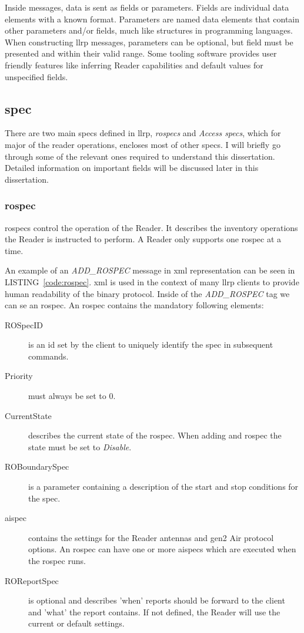 Inside messages, data is sent as fields or parameters.
Fields are individual data elements with a known format.
Parameters are named data elements that contain other parameters and/or fields, much like structures in programming languages.
When constructing \ac{llrp} messages, parameters can be optional, but field must be presented and within their valid range. Some tooling software provides user friendly features like inferring Reader capabilities and default values for unspecified fields.

\subsection{\acf{spec}}

There are two main \acp{spec} defined in \ac{llrp}, \textit{\acp{rospec}} and \textit{Access \acp{spec}}, which for major of the reader operations, encloses most of other \acp{spec}.
I will briefly go through some of the relevant ones required to understand this dissertation. Detailed information on important fields will be discussed later in this dissertation.

\subsubsection{\acf{rospec}}

\acp{rospec} control the operation of the Reader. It describes the inventory operations the Reader is instructed to perform.
A Reader only supports one \ac{rospec} at a time.

An example of an \textit{ADD\_ROSPEC} message in \ac{xml} representation can be seen in LISTING~\ref{code:rospec}. \ac{xml} is used in the context of many \ac{llrp} clients to provide human readability of the binary protocol.
Inside of the \textit{ADD\_ROSPEC} tag we can se an \ac{rospec}.
An \ac{rospec} contains the mandatory following elements: 

\begin{description}
    \item[ROSpecID] is an \ac{id} set by the client to uniquely identify the spec in subsequent commands.
    \item[Priority] must always be set to $0$.
    \item[CurrentState] describes the current state of the \ac{rospec}. When adding and \ac{rospec} the state must be set to \emph{Disable}.
    \item[ROBoundarySpec] is a parameter containing a description of the start and stop conditions for the \ac{spec}.
    \item[\ac{aispec}] contains the settings for the Reader antennas and \ac{gen2} Air protocol options. An \ac{rospec} can have one or more \acp{aispec} which are executed when the \ac{rospec} runs.
    \item[ROReportSpec] is optional and describes 'when' reports should be forward to the client and 'what' the report contains. If not defined, the Reader will use the current or default settings.
\end{description}
 

